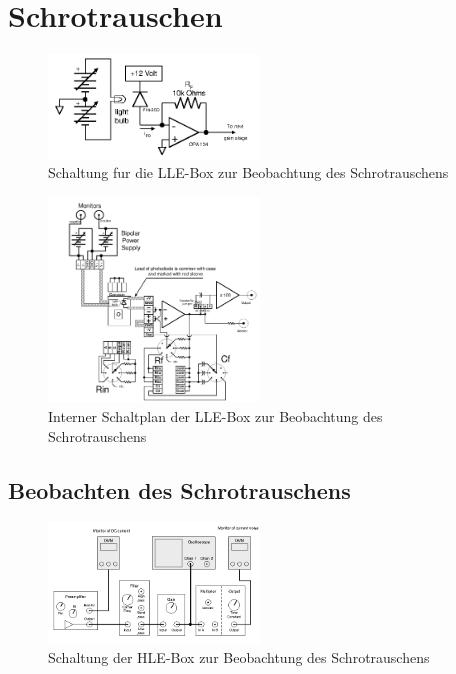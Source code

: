 \chapter{Schrotrauschen}

\FloatBarrier
\begin{figure}[htbp]
    \centering
    \includegraphics[width=0.5\textwidth]{figs/schrot schaltung.png}
    \caption{Schaltung fur die LLE-Box zur Beobachtung des Schrotrauschens \cite{praktikum}}
    \label{fig:schrotschaltung }
\end{figure}
\FloatBarrier

\FloatBarrier
\begin{figure}[htbp]
    \centering
    \includegraphics[width=0.5\textwidth]{figs/schrot lle.png}
    \caption{Interner Schaltplan der LLE-Box zur Beobachtung des Schrotrauschens \cite{praktikum}}
    \label{fig:schrotlle}
\end{figure}
\FloatBarrier

\section{Beobachten des Schrotrauschens}
\FloatBarrier
\begin{figure}[htbp]
    \centering 
    \includegraphics[width=0.5\textwidth]{figs/schrot hle.png}
    \caption{Schaltung der HLE-Box zur Beobachtung des Schrotrauschens \cite{praktikum}}
    \label{fig:schrothle}
\end{figure}
\FloatBarrier
